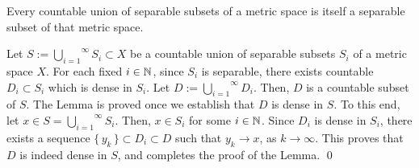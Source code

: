 \vskip 0.6cm
\begin{lemma}
\mbox{}
\vskip 0.3cm
\noindent
Every countable union of separable subsets of a metric space is itself a separable subset of that metric space.
\end{lemma}
\proof
Let $S := \overset{\infty}{\underset{i=1}{\bigcup}}S_{i} \subset X$ be a countable union
of separable subsets $S_{i}$ of a metric space $X$.
For each fixed $i \in \mathbb{N}$,
since $S_{i}$ is separable, there exists countable $D_{i} \subset S_{i}$ which is dense in $S_{i}$.
Let $D := \overset{\infty}{\underset{i=1}{\bigcup}}D_{i}$.
Then, $D$ is a countable subset of $S$.
The Lemma is proved once we establish that $D$ is dense in $S$.
To this end, let $x \in S = \overset{\infty}{\underset{i=1}{\bigcup}}S_{i}$.
Then, $x \in S_{i}$ for some $i \in \mathbb{N}$.
Since $D_{i}$ is dense in $S_{i}$, there exists a sequence
$\{\,y_{k}\,\} \subset D_{i} \subset D$ such that $y_{k} \longrightarrow x$, as $k \longrightarrow \infty$.
This proves that $D$ is indeed dense in $S$, and completes the proof of the Lemma.
\qed

